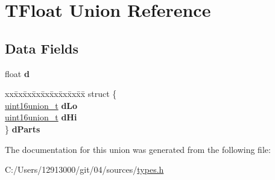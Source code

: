 \hypertarget{union_t_float}{}\section{T\+Float Union Reference}
\label{union_t_float}
\subsection*{Data Fields}
\begin{DoxyCompactItemize}
\item 
\hypertarget{union_t_float_a5261069e995f7e1b2b3b7580c954996b}{}float {\bfseries d}\label{union_t_float_a5261069e995f7e1b2b3b7580c954996b}

\item 
\hypertarget{union_t_float_a1b95eceaf610681eac7f510f241a4f05}{}\begin{tabbing}
xx\=xx\=xx\=xx\=xx\=xx\=xx\=xx\=xx\=\kill
struct \{\\
\>\hyperlink{unionuint16union__t}{uint16union\_t} {\bfseries dLo}\\
\>\hyperlink{unionuint16union__t}{uint16union\_t} {\bfseries dHi}\\
\} {\bfseries dParts}\label{union_t_float_a1b95eceaf610681eac7f510f241a4f05}
\\

\end{tabbing}\end{DoxyCompactItemize}


The documentation for this union was generated from the following file\+:\begin{DoxyCompactItemize}
\item 
C\+:/\+Users/12913000/git/04/sources/\hyperlink{types_8h}{types.\+h}\end{DoxyCompactItemize}
